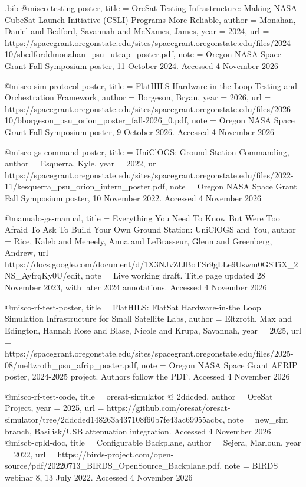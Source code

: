 \begin{filecontents*}[overwrite]{\jobname.bib}
@misc{o-testing-poster,
  title = {{OreSat Testing Infrastructure: Making NASA CubeSat Launch Initiative (CSLI) Programs More Reliable}},
  author = {Monahan, Daniel and Bedford, Savannah and McNames, James},
  year = {2024},
  url = {https://spacegrant.oregonstate.edu/sites/spacegrant.oregonstate.edu/files/2024-10/sbedforddmonahan_psu_uteap_poster.pdf},
  note = {Oregon NASA Space Grant Fall Symposium poster, 11 October 2024. Accessed 4 November 2026}
}

@misc{o-sim-protocol-poster,
  title = {{FlatHILS Hardware-in-the-Loop Testing and Orchestration Framework}},
  author = {Borgeson, Bryan},
  year = {2026},
  url = {https://spacegrant.oregonstate.edu/sites/spacegrant.oregonstate.edu/files/2026-10/bborgeson_psu_orion_poster_fall-2026_0.pdf},
  note = {Oregon NASA Space Grant Fall Symposium poster, 9 October 2026. Accessed 4 November 2026}
}

@misc{o-gs-command-poster,
  title = {{UniClOGS: Ground Station Commanding}},
  author = {Esquerra, Kyle},
  year = {2022},
  url = {https://spacegrant.oregonstate.edu/sites/spacegrant.oregonstate.edu/files/2022-11/kesquerra_psu_orion_intern_poster.pdf},
  note = {Oregon NASA Space Grant Fall Symposium poster, 10 November 2022. Accessed 4 November 2026}
}

@manual{o-gs-manual,
  title = {{Everything You Need To Know But Were Too Afraid To Ask To Build Your Own Ground Station: UniClOGS and You}},
  author = {Rice, Kaleb and Meneely, Anna and LeBrasseur, Glenn and Greenberg, Andrew},
  url = {https://docs.google.com/document/d/1X3NJvZIJBoTSr9gLLe9Uswm0GSTiX_2NS_AyfrqKy0U/edit},
  note = {Live working draft. Title page updated 28 November 2023, with later 2024 annotations. Accessed 4 November 2026}
}

@misc{o-rf-test-poster,
  title = {{FlatHILS: FlatSat Hardware-in-the Loop Simulation Infrastructure for Small Satellite Labs}},
  author = {Eltzroth, Max and Edington, Hannah Rose and Blase, Nicole and Krupa, Savannah},
  year = {2025},
  url = {https://spacegrant.oregonstate.edu/sites/spacegrant.oregonstate.edu/files/2025-08/meltzroth_psu_afrip_poster.pdf},
  note = {Oregon NASA Space Grant AFRIP poster, 2024-2025 project. Authors follow the PDF. Accessed 4 November 2026}
}

@misc{o-rf-test-code,
  title = {{oresat-\allowbreak{}simulator @ 2ddcded}},
  author = {{OreSat Project}},
  year = {2025},
  url = {https://github.com/oresat/oresat-simulator/tree/2ddcded148263a437108f60b7fe43ac69955acbc},
  note = {new\_sim branch, Basilisk/USB attenuation integration. Accessed 4 November 2026}
}
@misc{b-cpld-doc,
  title = {{Configurable Backplane}},
  author = {Sejera, Marloun},
  year = {2022},
  url = {https://birds-project.com/open-source/pdf/20220713_BIRDS_OpenSource_Backplane.pdf},
  note = {BIRDS webinar 8, 13 July 2022. Accessed 4 November 2026}
}


\end{filecontents*}
